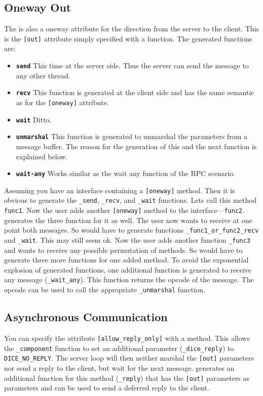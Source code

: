 \subsection{Oneway Out}

The is also a oneway attribute for the direction from the server to the client.
This is the \verb|[out]| attribute simply specified with a function.  The 
generated functions are:

\begin{itemize}
\item \textbf{\texttt{send}} This time at the server side.  Thus the server can
      send the message to any other thread.

\item \textbf{\texttt{recv}} This function is generated at the client side and
      has the same semantic as for the \verb|[oneway]| attribute.

\item \textbf{\texttt{wait}} Ditto.

\item \textbf{\texttt{unmarshal}} This function is generated to unmarshal the 
      parameters from a message buffer. The reason for the generation of this
      and the next function is explained below.

\item \textbf{\texttt{wait-any}} Works similar as the wait any function of the
      RPC scenario.
\end{itemize}

Assuming you have an interface containing a \verb|[oneway]| method.  Then it 
is obvious to generate the \verb|_send|, \verb|_recv|, and \verb|_wait| 
functions.  Lets call this method \verb|func1|.  Now the user adds another
\verb|[oneway]| method to the interface---\verb|func2|.  \dice{} generates
the three function for it as well.  The user now wants to receive at one point
both messages.  So \dice{} would have to generate functions 
\verb|_func1_or_func2_recv| and \verb|_wait|.  This may still seem ok.  Now
the user adds another function \verb|_func3| and wants to receive any possible
permutation of methods.  So \dice{} would have to generate three more 
functions for one added method.  To avoid the exponential explosion of 
generated functions, one additional function is generated to receive any 
message (\verb|_wait_any|).  This function returns the opcode of the message.
The opcode can be used to call the appropriate \verb|_unmarshal| function.

\subsection{Asynchronous Communication}
You can specify the attribute \verb|[allow_reply_only]| with a method.
This allows the \verb|_component| function to set an additional parameter
(\verb|_dice_reply|) to \verb|DICE_NO_REPLY|.  The server loop will then
neither marshal the \verb|[out]| parameters nor send a reply to the client,
but wait for the next message.  \dice{} generates an additional function 
for this method (\verb|_reply|) that has the \verb|[out]| parameters as
parameters and can be used to send a deferred reply to the client.

